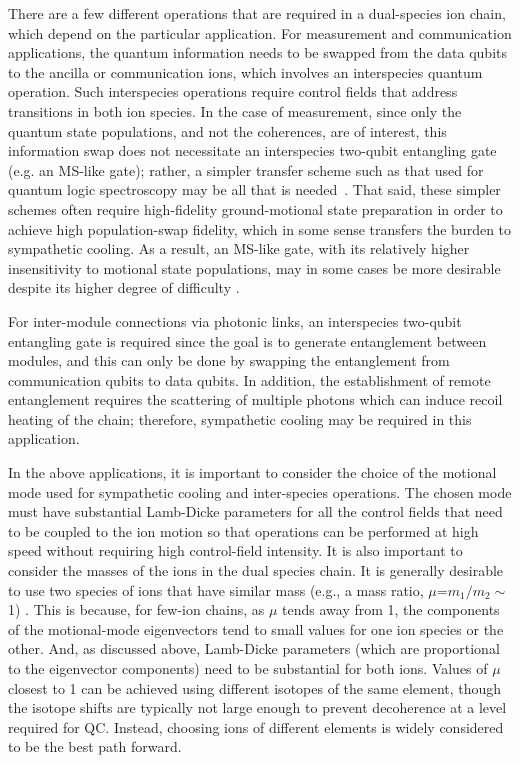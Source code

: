 \documentclass[%
12pt,
 amsmath,amssymb,
]{revtex4-2}
\begin{document}
There are a few different operations that are required in a dual-species ion chain, which depend on the particular application.  For measurement and communication applications, the quantum information needs to be swapped from the data qubits to the ancilla or communication ions, which involves an interspecies quantum operation.  Such interspecies operations require control fields that address transitions in both ion species.  In the case of measurement, since only the quantum state populations, and not the coherences, are of interest, this information swap does not necessitate an interspecies two-qubit entangling gate (e.g. an MS-like gate); rather, a simpler transfer scheme such as that used for quantum logic spectroscopy may be all that is needed~\cite{SchmidtQuantumLogicSpectroscopy, BruzewiczQLAR2017}.  That said, these simpler schemes often require high-fidelity ground-motional state preparation in order to achieve high population-swap fidelity, which in some sense transfers the burden to sympathetic cooling.  As a result, an MS-like gate, with its relatively higher insensitivity to motional state populations, may in some cases be more desirable despite its higher degree of difficulty .

For inter-module connections via photonic links, an interspecies two-qubit entangling gate is required since the goal is to generate entanglement between modules, and this can only be done by swapping the entanglement from communication qubits to data qubits.  In addition, the establishment of remote entanglement requires the scattering of multiple photons which can induce recoil heating of the chain; therefore, sympathetic cooling may be required in this application.

In the above applications, it is important to consider the choice of the motional mode used for sympathetic cooling and inter-species operations.  The chosen mode must have substantial Lamb-Dicke parameters for all the control fields that need to be coupled to the ion motion so that operations can be performed at high speed without requiring high control-field intensity.  It is also important to consider the masses of the ions in the dual species chain. It is generally desirable to use two species of ions that have similar mass (e.g., a mass ratio, $\mu$=$m_1/m_2\sim$1) \cite{WubennaSympCooling2012, HomeMixedSpecies2013}.  This is because, for few-ion chains, as $\mu$ tends away from 1, the components of the motional-mode eigenvectors tend to small values for one ion species or the other.  And, as discussed above, Lamb-Dicke parameters (which are proportional to the eigenvector components) need to be substantial for both ions. Values of $\mu$ closest to 1 can be achieved using different isotopes of the same element, though the isotope shifts are typically not large enough to prevent decoherence at a level required for QC. Instead, choosing ions of different elements is widely considered to be the best path forward.
\end{document}
